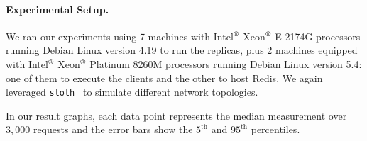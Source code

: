 \paragraph{Experimental Setup.}
We ran our experiments using 7 machines  with
Intel$^\text{\textregistered}$ Xeon$^\text{\textregistered}$ E-2174G
processors running Debian Linux version 4.19 to run the replicas,
plus 2 machines equipped with Intel$^\text{\textregistered}$
Xeon$^\text{\textregistered}$ Platinum 8260M processors running Debian
Linux version 5.4: one of them to execute the clients and the other to
host Redis.
%
We again leveraged \texttt{sloth}~\cite{sloth} to simulate
different network topologies.

In our result graphs, each data point represents the median
measurement over $3,000$ requests and the error bars show the $5^{\text{th}}$ and
$95^{\text{th}}$ percentiles.

